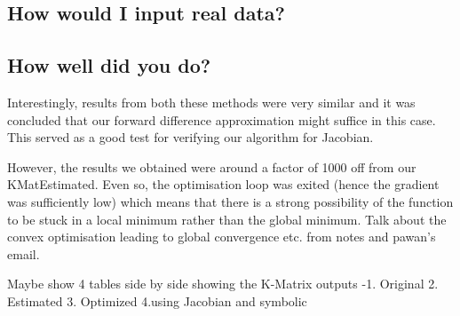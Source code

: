 \documentclass[titlepage]{article}
\begin{document}
\subsection{How would I input real data?}
\subsection{How well did you do?}
Interestingly, results from both these methods were very similar and it was concluded that our forward difference approximation might suffice in this case. This served as a good test for verifying our algorithm for Jacobian.


However, the results we obtained were around a factor of 1000 off from our KMatEstimated. Even so, the optimisation loop was exited (hence the gradient was sufficiently low) which means that there is a strong possibility of the function to be stuck in a local minimum rather than the global minimum. Talk about the convex optimisation leading to global convergence etc. from notes and pawan’s email.


Maybe show 4 tables side by side showing the K-Matrix outputs -1. Original 2. Estimated 3. Optimized 4.using Jacobian and symbolic
\end{document}
